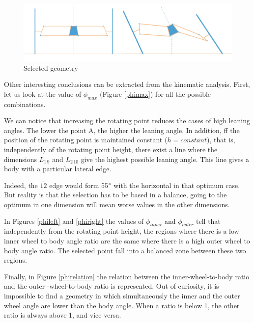 \begin{figure}[h!]
	\includegraphics[width=1.0\linewidth]{figs/05/sim/4}
	\caption{Selected geometry}
	\label{selectedgeometry}
\end{figure}

Other interesting conclusions can be extracted from the kinematic analysis. First, let us look at the value of $\phi_{max}$ (Figure \ref{phimax}) for all the possible combinations. 

We can notice that increasing the rotating point reduces the cases of high leaning angles. The lower the point A, the higher the leaning angle. In addition, ff the position of the rotating point is maintained constant ($h=constant$), that is, independently of the rotating point height, there exist a line where the dimensions $L_{1\,9}$ and $L_{2\,10}$ give the highest possible leaning angle. This line gives a body with a particular lateral edge. 

Indeed, the $\bar{12}$ edge would form 55$\degree$ with the horizontal in that optimum case. But reality is that the selection has to be based in a balance, going to the optimum in one dimension will mean worse values in the other dimensions.

In Figures \ref{phileft} and \ref{phiright} the values of $\phi_{inner}$ and $\phi_{outer}$ tell that independently from the rotating point height, the regions where there is a low inner wheel to body angle ratio are the same where there is a high outer wheel to body angle ratio. The selected point fall into a balanced zone between these two regions.

Finally, in Figure \ref{phirelation} the relation between the inner-wheel-to-body ratio and the outer -wheel-to-body ratio is represented. Out of curiosity, it is impossible to find a geometry in which simultaneously the inner and the outer wheel angle are lower than the body angle. When a ratio is below 1, the other ratio is always above 1, and vice versa.

